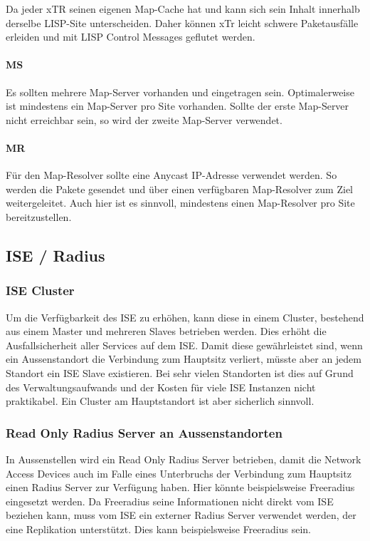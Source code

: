 Da jeder xTR seinen eigenen Map-Cache hat und kann sich sein Inhalt innerhalb derselbe LISP-Site unterscheiden. Daher können xTr leicht schwere Paketausfälle erleiden und mit LISP Control Messages geflutet werden.  

\paragraph{MS}
Es sollten mehrere Map-Server vorhanden und eingetragen sein. Optimalerweise ist mindestens ein Map-Server pro Site vorhanden. Sollte der erste Map-Server nicht erreichbar sein, so wird der zweite Map-Server verwendet.

\paragraph{MR}
Für den Map-Resolver sollte eine Anycast IP-Adresse verwendet werden. So werden die Pakete gesendet und über einen verfügbaren Map-Resolver zum Ziel weitergeleitet. Auch hier ist es sinnvoll, mindestens einen Map-Resolver pro Site bereitzustellen.

\subsection{ISE / Radius}

\subsubsection{ISE Cluster}

Um die Verfügbarkeit des ISE zu erhöhen, kann diese in einem Cluster, bestehend aus einem Master und mehreren Slaves betrieben werden. Dies erhöht die Ausfallsicherheit aller Services auf dem ISE. Damit diese gewährleistet sind, wenn ein Aussenstandort die Verbindung zum Hauptsitz verliert, müsste aber an jedem Standort ein ISE Slave existieren. Bei sehr vielen Standorten ist dies auf Grund des Verwaltungsaufwands und der Kosten für viele ISE Instanzen nicht praktikabel. Ein Cluster am Hauptstandort ist aber sicherlich sinnvoll.

\subsubsection{Read Only Radius Server an Aussenstandorten}

In Aussenstellen wird ein Read Only Radius Server betrieben, damit die Network Access Devices auch im Falle eines Unterbruchs der Verbindung zum Hauptsitz einen Radius Server zur Verfügung haben. Hier könnte beispielsweise Freeradius eingesetzt werden. Da Freeradius seine Informationen nicht direkt vom ISE beziehen kann, muss vom ISE ein externer Radius Server verwendet werden, der eine Replikation unterstützt. Dies kann beispielsweise Freeradius sein.

